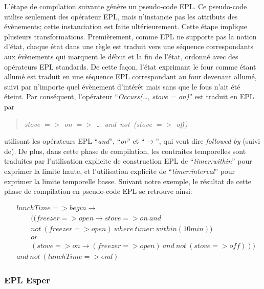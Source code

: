 L'étape de compilation suivante génère un pseudo-code EPL. Ce pseudo-code utilise seulement des opérateur EPL, mais n'instancie pas les attributs des évènements; cette instanciation est faite ultérieurement. Cette étape implique plusieurs transformations. Premièrement, comme EPL ne supporte pas la notion d'état, chaque état dans une règle est traduit vers une séquence correspondants aux évènements qui marquent le début et la fin de l'état, ordonné avec des opérateurs EPL standards. De cette façon, l'état exprimant le four comme étant allumé est traduit en une séquence EPL correspondant au four devenant allumé, suivi par n'importe quel évènement d'intérêt mais sans que le fous n'ait été éteint. Par conséquent, l'opérateur ``{\em Occurs(\dots, stove = on)}'' est traduit en EPL par 
\begin{quote} {\em stove $=>$ on $=>$ \dots\ and\ not\ (stove $=>$ off)} \end{quote}
\noindent 
utilisant les opérateurs EPL ``{\em and}'', ``{\em or}'' et ``$\rightarrow$'', qui veut dire {\em followed by} (suivi de). De plus, dans cette phase de compilation, les contraites temporelles sont traduites par l'utilisation explicite de construction EPL de ``{\em timer:within}'' pour exprimer la limite haute, et l'utilisation explicite de ``{\em timer:interval}'' pour exprimer la limite temporelle basse. Suivant notre exemple, le résultat de cette phase de compilation en pseudo-code EPL se retrouve ainsi:

\footnotesize
\begin{equation*}
  \begin{split}
&lunchTime=> begin \rightarrow\\
&\quad\quad ( ( freezer=> open \rightarrow  stove=> on\ and\\ 
&\quad\quad not\ ( freezer=> open )\ where\ timer:within(10min) )\\ 
&\quad\quad or\\  
&\quad\quad ( stove=> on \rightarrow  ( freezer=> open )\ and\ not\ ( stove=> off ) ) )  \\
&and\ not\ ( lunchTime=> end )
  \end{split}
\end{equation*}
\normalsize

\subsubsection{EPL Esper}


